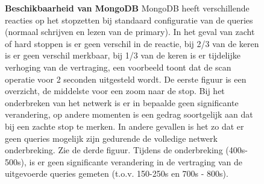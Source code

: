  
\begin{figure}[ht!] 
	\centering
	\caption{\textbf{Beschikbaarheid van MongoDB} \newline
	MongoDB heeft verschillende reacties op het stopzetten bij standaard configuratie van de queries (normaal schrijven en lezen van de primary). In het geval van zacht of hard stoppen is er geen verschil in de reactie, bij 2/3 van de keren is er geen verschil merkbaar, bij 1/3 van de keren is er tijdelijke verhoging van de vertraging, een voorbeeld toont dat de scan operatie voor 2 seconden uitgesteld wordt. De eerste figuur is een overzicht, de middelste voor een zoom naar de stop.\newline
	Bij het onderbreken van het netwerk is er in bepaalde geen significante verandering, op andere momenten is een gedrag soortgelijk aan dat bij een zachte stop te merken. In andere gevallen is het zo dat er geen queries mogelijk zijn gedurende de volledige netwerk onderbreking. Zie de derde figuur. \newline
	Tijdens de onderbreking (400s- 500s), is er geen significante verandering in de vertraging van de uitgevoerde queries gemeten (t.o.v. 150-250s en 700s - 800s). \newline
	 }
	\label{fig:beschikbaar-mongodb-1}
\end{figure}

